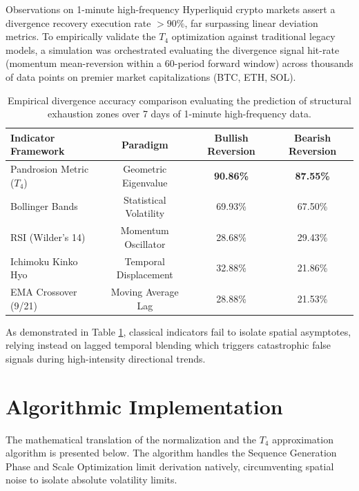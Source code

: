 \documentclass[11pt,a4paper]{article}
\begin{document}
Observations on 1-minute high-frequency Hyperliquid crypto markets assert a divergence recovery execution rate $ > 90\%$, far surpassing linear deviation metrics. To empirically validate the $T_4$ optimization against traditional legacy models, a simulation was orchestrated evaluating the divergence signal hit-rate (momentum mean-reversion within a 60-period forward window) across thousands of data points on premier market capitalizations (BTC, ETH, SOL).

\begin{table}[hbt!]
\centering
\begin{tabular}{@{}lccc@{}}
\toprule
\textbf{Indicator Framework} & \textbf{Paradigm} & \textbf{Bullish Reversion} & \textbf{Bearish Reversion} \\ \midrule
Pandrosion Metric ($T_4$) & Geometric Eigenvalue & \textbf{90.86\%} & \textbf{87.55\%} \\
Bollinger Bands & Statistical Volatility & 69.93\% & 67.50\% \\
RSI (Wilder's 14) & Momentum Oscillator & 28.68\% & 29.43\% \\
Ichimoku Kinko Hyo & Temporal Displacement & 32.88\% & 21.86\% \\
EMA Crossover (9/21) & Moving Average Lag & 28.88\% & 21.53\% \\ \bottomrule
\end{tabular}
\caption{Empirical divergence accuracy comparison evaluating the prediction of structural exhaustion zones over 7 days of 1-minute high-frequency data.}
\label{tab:comparison}
\end{table}

As demonstrated in Table \ref{tab:comparison}, classical indicators fail to isolate spatial asymptotes, relying instead on lagged temporal blending which triggers catastrophic false signals during high-intensity directional trends.

\clearpage
\section{Algorithmic Implementation}
The mathematical translation of the normalization and the $T_4$ approximation algorithm is presented below. The algorithm handles the Sequence Generation Phase and Scale Optimization limit derivation natively, circumventing spatial noise to isolate absolute volatility limits.
\end{document}
